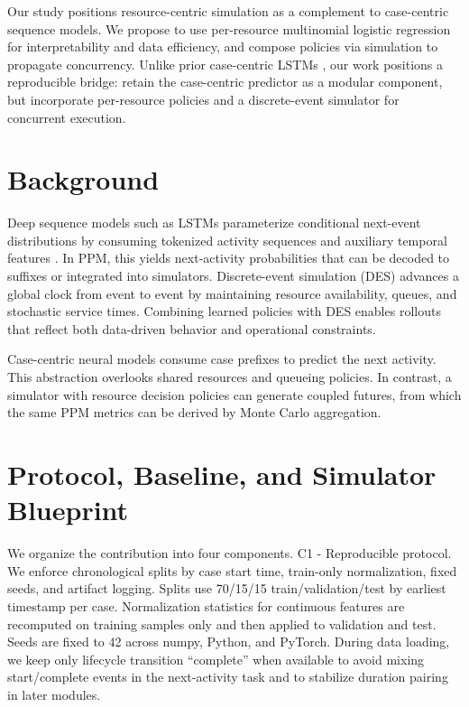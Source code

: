 \documentclass{article}
\theoremstyle{plain}
\theoremstyle{definition}
\theoremstyle{remark}
\begin{document}
	Our study positions resource-centric simulation as a complement to case-centric sequence models. We propose to use per-resource multinomial logistic regression \citep{hosmer2013applied} for interpretability and data efficiency, and compose policies via simulation to propagate concurrency. Unlike prior case-centric LSTMs \citep{tax2017predictive,evermann2017predicting,camargo2020learning}, our work positions a reproducible bridge: retain the case-centric predictor as a modular component, but incorporate per-resource policies and a discrete-event simulator for concurrent execution.
	
	\section{Background}
	\label{sec:background}
	Deep sequence models such as LSTMs parameterize conditional next-event distributions by consuming tokenized activity sequences and auxiliary temporal features \citep{goodfellow2016deep}. In PPM, this yields next-activity probabilities that can be decoded to suffixes or integrated into simulators. Discrete-event simulation (DES) advances a global clock from event to event by maintaining resource availability, queues, and stochastic service times. Combining learned policies with DES enables rollouts that reflect both data-driven behavior and operational constraints.
	
	Case-centric neural models consume case prefixes to predict the next activity. This abstraction overlooks shared resources and queueing policies. In contrast, a simulator with resource decision policies can generate coupled futures, from which the same PPM metrics can be derived by Monte Carlo aggregation.
	
	\section{Protocol, Baseline, and Simulator Blueprint}
	\label{sec:method}
	We organize the contribution into four components. C1 - Reproducible protocol. We enforce chronological splits by case start time, train-only normalization, fixed seeds, and artifact logging. Splits use 70/15/15 train/validation/test by earliest timestamp per case. Normalization statistics for continuous features are recomputed on training samples only and then applied to validation and test. Seeds are fixed to 42 across numpy, Python, and PyTorch. During data loading, we keep only lifecycle transition ``complete'' when available to avoid mixing start/complete events in the next-activity task and to stabilize duration pairing in later modules.
	
\end{document}
